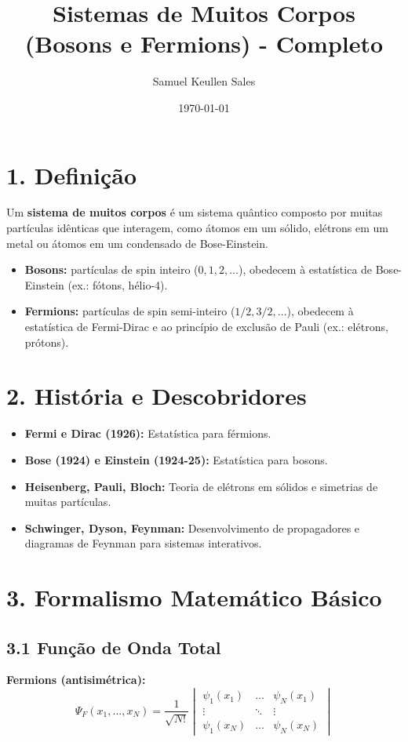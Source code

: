 \documentclass[12pt,a4paper]{article}
\title{Sistemas de Muitos Corpos (Bosons e Fermions) - Completo}
\author{Samuel Keullen Sales}
\date{\today}
\begin{document}
\maketitle

\section*{1. Definição}
Um \textbf{sistema de muitos corpos} é um sistema quântico composto por muitas partículas idênticas que interagem, como átomos em um sólido, elétrons em um metal ou átomos em um condensado de Bose-Einstein.

\begin{itemize}
    \item \textbf{Bosons:} partículas de spin inteiro (\(0,1,2,\dots\)), obedecem à estatística de Bose-Einstein (ex.: fótons, hélio-4).
    \item \textbf{Fermions:} partículas de spin semi-inteiro (\(1/2, 3/2, \dots\)), obedecem à estatística de Fermi-Dirac e ao princípio de exclusão de Pauli (ex.: elétrons, prótons).
\end{itemize}

\section*{2. História e Descobridores}
\begin{itemize}
    \item \textbf{Fermi e Dirac (1926):} Estatística para férmions.
    \item \textbf{Bose (1924) e Einstein (1924-25):} Estatística para bosons.
    \item \textbf{Heisenberg, Pauli, Bloch:} Teoria de elétrons em sólidos e simetrias de muitas partículas.
    \item \textbf{Schwinger, Dyson, Feynman:} Desenvolvimento de propagadores e diagramas de Feynman para sistemas interativos.
\end{itemize}

\section*{3. Formalismo Matemático Básico}

\subsection*{3.1 Função de Onda Total}

\textbf{Fermions (antisimétrica):}
\[
\Psi_F(x_1, \dots, x_N) = \frac{1}{\sqrt{N!}}
\begin{vmatrix}
\psi_1(x_1) & \dots & \psi_N(x_1) \\
\vdots & \ddots & \vdots \\
\psi_1(x_N) & \dots & \psi_N(x_N)
\end{vmatrix}
\]
\end{document}
